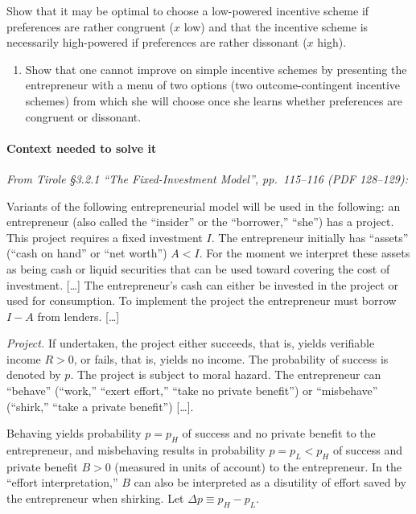 \documentclass[11pt,a4paper]{article}
\providecommand{\tightlist}{\setlength{\itemsep}{0pt}\setlength{\parskip}{0pt}}
\begin{document}
Show that it may be optimal to choose a low-powered incentive scheme if preferences are rather
congruent (\(x\) low) and that the incentive scheme is necessarily high-powered if preferences are
rather dissonant (\(x\) high).

\begin{enumerate}
\def\labelenumi{(\roman{enumi})}
\setcounter{enumi}{1}
\tightlist
\item
  Show that one cannot improve on simple incentive schemes by presenting the entrepreneur with a
  menu of two options (two outcome-contingent incentive schemes) from which she will choose once she
  learns whether preferences are congruent or dissonant.
\end{enumerate}

\paragraph{Context needed to solve it}

\emph{From Tirole §3.2.1 ``The Fixed-Investment Model'', pp.~115--116 (PDF 128--129):}

Variants of the following entrepreneurial model will be used in the following: an entrepreneur (also
called the ``insider'' or the ``borrower,'' ``she'') has a project. This project requires a fixed
investment \(I\). The entrepreneur initially has ``assets'' (``cash on hand'' or ``net worth'')
\(A < I\). For the moment we interpret these assets as being cash or liquid securities that can be
used toward covering the cost of investment. {[}\ldots{]} The entrepreneur's cash can either be
invested in the project or used for consumption. To implement the project the entrepreneur must
borrow \(I - A\) from lenders. {[}\ldots{]}

\emph{Project.} If undertaken, the project either succeeds, that is, yields verifiable income
\(R > 0\), or fails, that is, yields no income. The probability of success is denoted by \(p\). The
project is subject to moral hazard. The entrepreneur can ``behave'' (``work,'' ``exert effort,''
``take no private benefit'') or ``misbehave'' (``shirk,'' ``take a private benefit'') {[}\ldots{]}.

Behaving yields probability \(p = p_H\) of success and no private benefit to the entrepreneur, and
misbehaving results in probability \(p = p_L < p_H\) of success and private benefit \(B > 0\)
(measured in units of account) to the entrepreneur. In the ``effort interpretation,'' \(B\) can also
be interpreted as a disutility of effort saved by the entrepreneur when shirking. Let
\(\Delta p \equiv p_H - p_L\).
\end{document}
